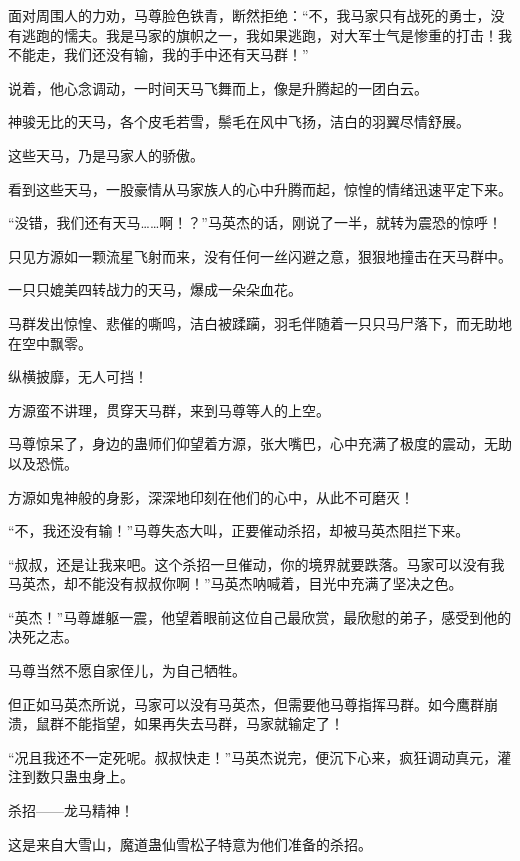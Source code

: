 
\begin{this_body}



面对周围人的力劝，马尊脸色铁青，断然拒绝：“不，我马家只有战死的勇士，没有逃跑的懦夫。我是马家的旗帜之一，我如果逃跑，对大军士气是惨重的打击！我不能走，我们还没有输，我的手中还有天马群！”

说着，他心念调动，一时间天马飞舞而上，像是升腾起的一团白云。

神骏无比的天马，各个皮毛若雪，鬃毛在风中飞扬，洁白的羽翼尽情舒展。

这些天马，乃是马家人的骄傲。

看到这些天马，一股豪情从马家族人的心中升腾而起，惊惶的情绪迅速平定下来。

“没错，我们还有天马……啊！？”马英杰的话，刚说了一半，就转为震恐的惊呼！

只见方源如一颗流星飞射而来，没有任何一丝闪避之意，狠狠地撞击在天马群中。

一只只媲美四转战力的天马，爆成一朵朵血花。

马群发出惊惶、悲催的嘶鸣，洁白被蹂躏，羽毛伴随着一只只马尸落下，而无助地在空中飘零。

纵横披靡，无人可挡！

方源蛮不讲理，贯穿天马群，来到马尊等人的上空。

马尊惊呆了，身边的蛊师们仰望着方源，张大嘴巴，心中充满了极度的震动，无助以及恐慌。

方源如鬼神般的身影，深深地印刻在他们的心中，从此不可磨灭！

“不，我还没有输！”马尊失态大叫，正要催动杀招，却被马英杰阻拦下来。

“叔叔，还是让我来吧。这个杀招一旦催动，你的境界就要跌落。马家可以没有我马英杰，却不能没有叔叔你啊！”马英杰呐喊着，目光中充满了坚决之色。

“英杰！”马尊雄躯一震，他望着眼前这位自己最欣赏，最欣慰的弟子，感受到他的决死之志。

马尊当然不愿自家侄儿，为自己牺牲。

但正如马英杰所说，马家可以没有马英杰，但需要他马尊指挥马群。如今鹰群崩溃，鼠群不能指望，如果再失去马群，马家就输定了！

“况且我还不一定死呢。叔叔快走！”马英杰说完，便沉下心来，疯狂调动真元，灌注到数只蛊虫身上。

杀招——龙马精神！

这是来自大雪山，魔道蛊仙雪松子特意为他们准备的杀招。


\end{this_body}
